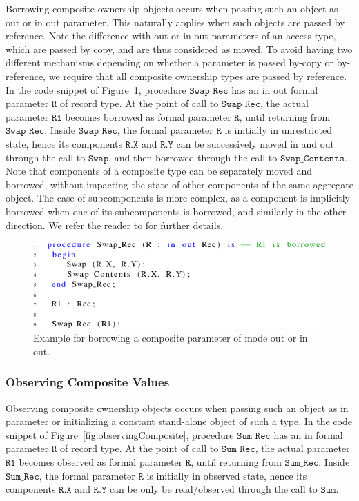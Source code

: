 \documentclass{llncs}
\newcommand\var[1]{\ensuremath{\mathtt{#1}}}
\newcommand{\keyword}[1]{\textsf{#1}}
\begin{document}
Borrowing composite ownership objects occurs when passing such an object as \keyword{out} or \keyword{in out} parameter. This naturally applies when
such objects are passed by reference. Note the difference with \keyword{out} or \keyword{in out} parameters of an access type, which are passed by copy,
and are thus considered as moved. To avoid having two different mechanisms depending on whether a parameter is passed by-copy or by-reference, we require
that all composite ownership types are passed by reference.
In the code snippet of Figure~\ref{fig:borrowingComposite}, procedure \var{Swap\_Rec} has an \keyword{in out} formal parameter \var{R} of record type. At the point of
call to \var{Swap\_Rec}, the actual parameter \var{R1} becomes borrowed as formal parameter \var{R}, until returning from \var{Swap\_Rec}. Inside \var{Swap\_Rec}, the formal parameter \var{R} is initially
in unrestricted state, hence its components \var{R.X} and \var{R.Y} can be successively moved in and out through the call to \var{Swap}, and then borrowed through the call to \var{Swap\_Contents}.
Note that components of a composite type can be separately moved and borrowed, without impacting the state of other components of the same aggregate object.
The case of subcomponents is more complex, as a component is implicitly borrowed when one of its subcomponents is borrowed, and similarly in the other direction.
We refer the reader to \cite{AI2017} for further details.

\begin{figure}[htb!]
\centering
   \includegraphics[]{borrowingComposite}
   \caption{Example for borrowing a composite parameter of mode \keyword{out} or \keyword{in out}.}
   \label{fig:borrowingComposite}
\end{figure}

   
\subsubsection{Observing Composite Values}
\label{subsubsec:extendingBorrowing}

Observing composite ownership objects occurs when passing such an object as \keyword{in} parameter or initializing a constant stand-alone object of such a type. 
In the code snippet of Figure~\ref{fig:observingComposite}, procedure \var{Sum\_Rec} has an \keyword{in} formal parameter \var{R} of record type.
At the point of call to \var{Sum\_Rec}, the actual parameter \var{R1} becomes observed as formal parameter \var{R}, until returning from \var{Sum\_Rec}. Inside \var{Sum\_Rec},
the formal parameter \var{R} is initially in observed state, hence its components \var{R.X} and \var{R.Y} can be only be read/observed through the call to \var{Sum}.
\end{document}

